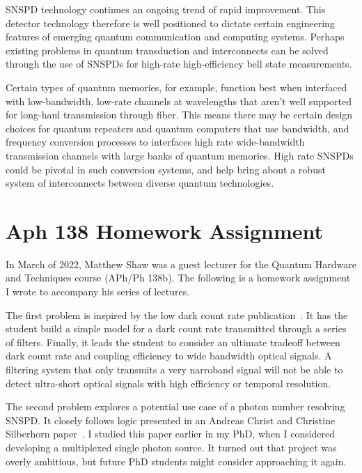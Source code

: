 \documentclass[11pt]{caltech_thesis} %
\begin{document}
SNSPD technology continues an ongoing trend of rapid improvement. This detector technology therefore is well positioned to dictate certain engineering features of emerging quantum communication and computing systems. Perhaps existing problems in quantum transduction and interconnects can be solved through the use of SNSPDs for high-rate high-efficiency bell state measurements.

Certain types of quantum memories, for example, function best when interfaced with low-bandwidth, low-rate channels at wavelengths that aren't well supported for long-haul transmission through fiber. This means there may be certain design choices for quantum repeaters and quantum computers that use bandwidth, and frequency conversion processes to interfaces high rate wide-bandwidth transmission channels with large banks of quantum memories. High rate SNSPDs could be pivotal in such conversion systems, and help bring about a robust system of interconnects between diverse quantum technologies.

\appendix

\hypertarget{aph-138-homework-assignment}{%
\chapter{Aph 138 Homework Assignment}\label{aph-138-homework-assignment}}

In March of 2022, Matthew Shaw was a guest lecturer for the Quantum Hardware and Techniques course (APh/Ph 138b). The following is a homework assignment I wrote to accompany his series of lectures.

The first problem is inspired by the low dark count rate publication~\autocite{Mueller:21}. It has the student build a simple model for a dark count rate transmitted through a series of filters. Finally, it leads the student to consider an ultimate tradeoff between dark count rate and coupling efficiency to wide bandwidth optical signals. A filtering system that only transmits a very narroband signal will not be able to detect ultra-short optical signals with high efficiency or temporal resolution.

The second problem explores a potential use case of a photon number resolving SNSPD. It closely follows logic presented in an Andreas Christ and Christine Silberhorn paper~\autocite{Andreas:12}. I studied this paper earlier in my PhD, when I considered developing a multiplexed single photon source. It turned out that project was overly ambitious, but future PhD students might consider approaching it again.
\end{document}
